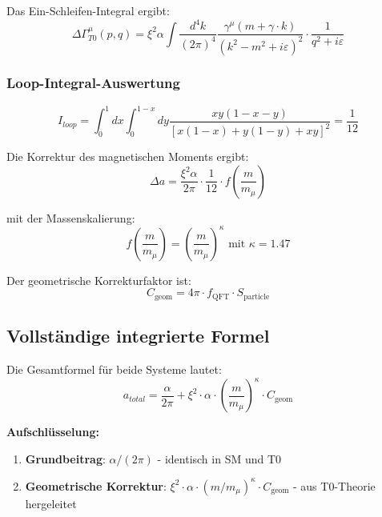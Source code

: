 \documentclass[12pt,a4paper]{article}
\numberwithin{equation}{section}
\newcommand{\xipar}{\xi}
\newcommand{\Cgeom}{C_{\text{geom}}}
\newcommand{\fQFT}{f_{\text{QFT}}}
\newcommand{\Sparticle}{S_{\text{particle}}}
\newcommand{\kappaT}{\kappa}
\newcommand{\mmu}{m_{\mu}}
\begin{document}
	Das Ein-Schleifen-Integral ergibt:
	\begin{equation}
		\label{eq:loop_integral}
		\Delta\Gamma^\mu_{T0}(p,q) = \xipar^2 \alpha \int \frac{d^4k}{(2\pi)^4} \frac{\gamma^\mu(m + \gamma \cdot k)}{(k^2 - m^2 + i\varepsilon)^2} \cdot \frac{1}{q^2 + i\varepsilon}
	\end{equation}
	
	\subsubsection{Loop-Integral-Auswertung}
	
	\begin{equation}
		\label{eq:loop_evaluation}
		I_{loop} = \int_0^1 dx \int_0^{1-x} dy \frac{xy(1-x-y)}{[x(1-x) + y(1-y) + xy]^2} = \frac{1}{12}
	\end{equation}
	
	Die Korrektur des magnetischen Moments ergibt:
	\begin{equation}
		\label{eq:magnetic_correction}
		\Delta a = \frac{\xipar^2 \alpha}{2\pi} \cdot \frac{1}{12} \cdot f\left(\frac{m}{\mmu}\right)
	\end{equation}
	
	mit der Massenskalierung:
	\begin{equation}
		\label{eq:mass_scaling}
		f\left(\frac{m}{\mmu}\right) = \left(\frac{m}{\mmu}\right)^\kappaT \text{ mit } \kappaT = 1.47
	\end{equation}
	
	Der geometrische Korrekturfaktor ist:
	\begin{equation}
		\label{eq:geometric_factor}
		\Cgeom = 4\pi \cdot \fQFT \cdot \Sparticle
	\end{equation}
	
	\subsection{Vollständige integrierte Formel}
	
	Die Gesamtformel für beide Systeme lautet:
	\begin{equation}
		\label{eq:total_formula}
		a_{total} = \frac{\alpha}{2\pi} + \xipar^2 \cdot \alpha \cdot \left(\frac{m}{\mmu}\right)^\kappaT \cdot \Cgeom
	\end{equation}
	
	\textbf{Aufschlüsselung:}
	\begin{enumerate}
		\item \textbf{Grundbeitrag}: $\alpha/(2\pi)$ - identisch in SM und T0
		\item \textbf{Geometrische Korrektur}: $\xipar^2 \cdot \alpha \cdot (m/\mmu)^\kappaT \cdot \Cgeom$ - aus T0-Theorie hergeleitet
	\end{enumerate}
	
\end{document}

